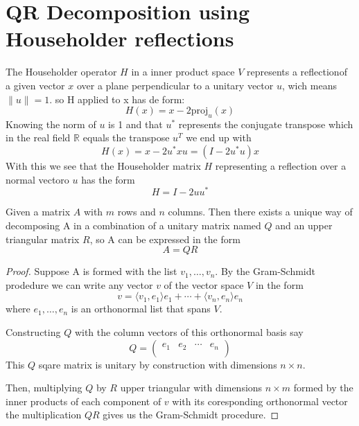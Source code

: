 \documentclass{scrartcl}
\begin{document}
\newpage

\section{QR Decomposition using Householder reflections}

\begin{definition}
The Householder operator $H$ in a inner product space $V$ represents a reflectionof a given vector $x$ over a plane perpendicular to a unitary vector $u$, wich means $\| u\| = 1$. so H applied to x has de form:
\[
  H(x) = x - 2\text{proj}_u(x)
\]
  Knowing the norm of $u$ is 1 and that $u^*$ represents the conjugate transpose which in the real field $\mathbb{R}$ equals the transpose $u^T$ we end up with
\[
  H(x) = x - 2 u^* x u = (I - 2 u^* u)x
\]
With this we see that the Householder matrix $H$ representing a reflection over a normal vectoro $u$ has the form
\[
  H = I - 2uu^*
\]
\end{definition}

\begin{definition}[QR Decomposition]
  Given a matrix $A$ with $m$ rows and $n$ columns. Then there exists a unique way of decomposing A in a combination of a unitary matrix named $Q$ and an upper triangular matrix $R$, so A can be expressed in the form
  \[
  A = QR
  \]
\end{definition}
\begin{proof}
  Suppose A is formed with the list $v_1,\ldots ,v_n$. By the Gram-Schmidt prodedure we can write any vector $v$ of the vector space $V$ in the form
  \[
  v = \langle v_1, e_1\rangle e_1 + \cdots + \langle v_n, e_n\rangle e_n
  \]
  where $e_1, \ldots ,e_n$ is an orthonormal list that spans $V$.

  Constructing $Q$ with the column vectors of this orthonormal basis say
  \[
  Q = \left( \begin{matrix}
                e_1 & e_2 & \cdots & e_n \\
             \end{matrix}
      \right)
  \]
  This $Q$ sqare matrix is unitary by construction with dimensions $n \times n$.

  Then, multiplying $Q$ by $R$ upper triangular with dimensions $n \times m$ formed by the inner products of each component of $v$ with its coresponding orthonormal vector the multiplication $QR$ gives us the Gram-Schmidt procedure.
\end{proof}
\end{document}
